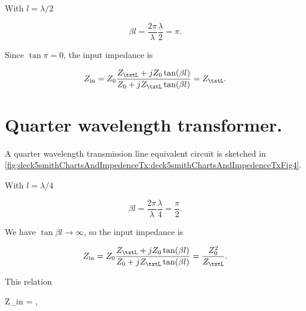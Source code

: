 
With \( l = \lambda/2 \)

\begin{dmath}\label{eqn:uwavesDeck5SmithChartCore:180}
\beta l 
= \frac{2 \pi}{\lambda} \frac{\lambda}{2}
= \pi.
\end{dmath}

Since \( \tan \pi = 0 \), the input impedance is

\begin{dmath}\label{eqn:uwavesDeck5SmithChartCore:200}
Z_{\textrm{in}} 
= Z_0 \frac{ Z_\txtL + j Z_0 \tan(\beta l) }{ Z_0 + j Z_\txtL \tan(\beta l)}
= Z_\txtL.
\end{dmath}

\section{Quarter wavelength transformer.}

A quarter wavelength transmission line equivalent circuit is sketched in \cref{fig:deck5smithChartsAndImpedenceTx:deck5smithChartsAndImpedenceTxFig4}.


With \( l = \lambda/4 \)

\begin{dmath}\label{eqn:uwavesDeck5SmithChartCore:220}
\beta l 
= \frac{2 \pi}{\lambda} \frac{\lambda}{4}
= \frac{\pi}{2}.
\end{dmath}

We have \( \tan \beta l \rightarrow \infty \), so the input impedance is

\begin{dmath}\label{eqn:uwavesDeck5SmithChartCore:240}
Z_{\textrm{in}} 
= Z_0 \frac{ Z_\txtL + j Z_0 \tan(\beta l) }{ Z_0 + j Z_\txtL \tan(\beta l)}
= \frac{Z_0^2}{Z_\txtL}.
\end{dmath}

This relation

{
Z_{\textrm{in}} 
= ,
}

